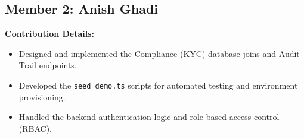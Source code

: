\subsection{Member 2: Anish Ghadi}
\textbf{Contribution Details:}
\begin{itemize}
    \item Designed and implemented the Compliance (KYC) database joins and Audit Trail endpoints.
    \item Developed the \texttt{seed\_demo.ts} scripts for automated testing and environment provisioning.
    \item Handled the backend authentication logic and role-based access control (RBAC).
\end{itemize}

